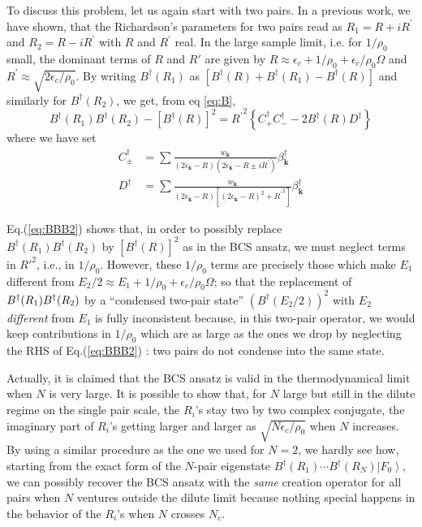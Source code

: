 \documentclass[epj]{svjour}
\newcommand{\vk}{\ensuremath{\mathbf{k}}}
\begin{document}
To discuss this problem, let us again start with two pairs. In
a previous work\cite{combescotBCS}, we have shown, that the Richardson's parameters for two pairs read as $R_1=R+iR^{\prime}$ and $R_2=R-i{}R^{\prime}$ with $R$
and $R^{\prime}$ real. In the
large sample limit, i.e. for $1/\rho_0$ small,  the dominant terms of $R$ and $R'$ are given by $R\approx\epsilon_c+1/%
\rho_0+\epsilon_c/\rho_0\Omega$ and $R^{\prime}\approx\sqrt{2\epsilon_c/\rho_0}$. By writing $B^{\dagger}(R_1)$ as $\left[B^{\dagger}(R)+B^{\dagger}(R_1)-B^{\dagger}(R)\right]$ and similarly for  $B^{\dagger}(R_2)$, 
we get, from eq \eqref{eq:B}, 
\begin{equation}\label{eq:BBB2}
B^{\dagger}(R_1)B^{\dagger}(R_2)-\left[B^{\dagger}(R)\right]
^2={R^{\prime}}^2\left\{C^{\dagger}_+C^{\dagger}_--2B^{\dagger}(R)D^{\dagger}%
\right\} 
\end{equation}
where we have set 
\begin{align}
C^{\dagger}_{\pm}&=\sum\frac{w_\vk}{\left(2\epsilon_\vk-R\right)
\left(2\epsilon_\vk-R\pm{}iR^{\prime}\right) }\beta^{\dagger}_\vk \\
D^{\dagger}&=\sum\frac{w_\vk}{\left(2\epsilon_\vk-R\right) \left[%
\left(2\epsilon_\vk-R\right) ^2+{}{R^{\prime}}^2\right] }\beta^{\dagger}_\vk
\end{align}

Eq.(\ref{eq:BBB2}) shows that, in order to possibly replace \\$B^{\dagger}(R_1)B^{\dagger}(R_2)$ by $\left[B^{\dagger}(R)\right]
^2$ as in the BCS ansatz, we must neglect terms in $R'^2$, i.e., in $1/\rho_0$. However, these $1/\rho_0$ terms are precisely those which make $E _1$ different from $E _2/2\approx E_1+1/\rho_0+\epsilon_c/\rho_0\Omega$; so that the replacement of $B^{\dagger}(R_1)B^{%
\dagger}(R_2)$ by a ``condensed two-pair state'' $\left(B^{\dagger}(E _2/2)\right) ^2$ with $E_2$ \emph{different }from $E_1$ is fully inconsistent because, in this two-pair
operator, we would keep contributions in $1/\rho_0$ which are as large as the ones we drop
by neglecting the RHS of Eq.(\ref{eq:BBB2}) : two pairs do not condense into the same state.

Actually, it is claimed that the BCS ansatz is valid in the thermodynamical
limit when $N$ is very large. It is possible to show that, for $N$ large but still in the dilute regime on the single pair scale, the $R_i$'s stay two by two complex conjugate, the imaginary part of $R_i $'s getting larger and larger as $\sqrt{N\epsilon_c/\rho_0}$ when $N$ increases. By using a similar procedure as the one we used for $N=2$, we hardly see how, 
starting from the exact form of the $N$-pair eigenstate $B^{\dagger}(R_1)\cdots{}B^{\dagger}(R_N)\left|F_0\right>  $, we can possibly recover the BCS ansatz with the \emph{same} 
creation operator for all  pairs when $N$ ventures outside the dilute limit because nothing special happens in the behavior of the $R_i$'s when $N$ crosses $N_c$. 
\end{document}
